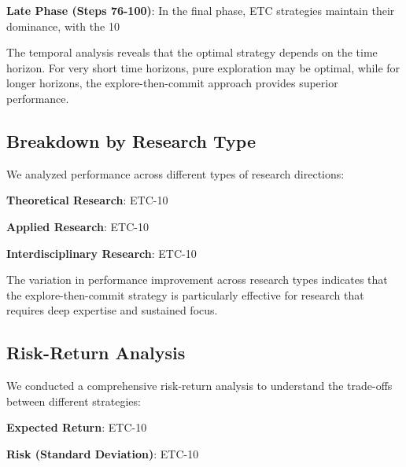 \documentclass[letterpaper]{article} %
\begin{document}
\textbf{Late Phase (Steps 76-100)}: In the final phase, ETC strategies maintain their dominance, with the 10%

The temporal analysis reveals that the optimal strategy depends on the time horizon. For very short time horizons, pure exploration may be optimal, while for longer horizons, the explore-then-commit approach provides superior performance.

\subsection{Breakdown by Research Type}

We analyzed performance across different types of research directions:

\textbf{Theoretical Research}: ETC-10%

\textbf{Applied Research}: ETC-10%

\textbf{Interdisciplinary Research}: ETC-10%

The variation in performance improvement across research types indicates that the explore-then-commit strategy is particularly effective for research that requires deep expertise and sustained focus.

\subsection{Risk-Return Analysis}

We conducted a comprehensive risk-return analysis to understand the trade-offs between different strategies:

\textbf{Expected Return}: ETC-10%

\textbf{Risk (Standard Deviation)}: ETC-10%
\end{document}
